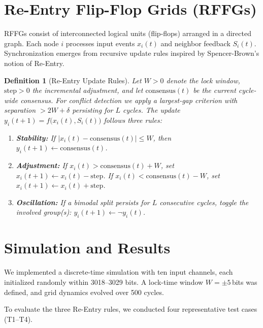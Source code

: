 \documentclass[11pt]{article}
\newtheorem{definition}{Definition}
\begin{document}
\section{Re-Entry Flip-Flop Grids (RFFGs)}
RFFGs consist of interconnected logical units (flip-flops) arranged in a directed graph. 
Each node $i$ processes input events $x_i(t)$ and neighbor feedback $S_i(t)$.
Synchronization emerges from recursive update rules inspired by Spencer-Brown’s notion of Re-Entry.

\begin{definition}[Re-Entry Update Rules]
Let $W>0$ denote the lock window, $\text{step}>0$ the incremental adjustment, and 
let $\mathrm{consensus}(t)$ be the current cycle-wide consensus.
For conflict detection we apply a largest-gap criterion with separation $>2W{+}\delta$ persisting for $L$ cycles.  
The update $y_i(t{+}1) = f\!\big(x_i(t),S_i(t)\big)$ follows three rules:

\begin{enumerate}[label=\textbf{R\arabic*}, leftmargin=1.8em]
  \item \textbf{Stability:}  
  If $\lvert x_i(t)-\mathrm{consensus}(t)\rvert \leq W$, then  
  $y_i(t{+}1) \gets \mathrm{consensus}(t)$.

  \item \textbf{Adjustment:}  
  If $x_i(t)>\mathrm{consensus}(t)+W$, set $x_i(t{+}1)\gets x_i(t)-\text{step}$.  
  If $x_i(t)<\mathrm{consensus}(t)-W$, set $x_i(t{+}1)\gets x_i(t)+\text{step}$.

  \item \textbf{Oscillation:}  
  If a bimodal split persists for $L$ consecutive cycles, toggle the involved group(s):  
  $y_i(t{+}1) \gets \lnot y_i(t)$.
\end{enumerate}
\end{definition}

\section{Simulation and Results}
We implemented a discrete-time simulation with ten input channels, each initialized randomly within \mbox{3018--3029} bits. A lock-time window $W=\pm 5$\,bits was defined, and grid dynamics evolved over 500 cycles. 

To evaluate the three Re-Entry rules, we conducted four representative test cases (T1–T4). 
\end{document}
